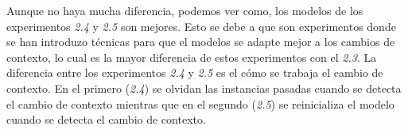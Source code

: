 \documentclass[11pt]{article}
\begin{document}
Aunque no haya mucha diferencia, podemos ver como, los modelos de los experimentos \textit{2.4} y \textit{2.5} son mejores. Esto se debe a que son experimentos donde se han introduzo técnicas para que el modelos se adapte mejor a los cambios de contexto, lo cual es la mayor diferencia de estos experimentos con el \textit{2.3}. La diferencia entre los experimentos \textit{2.4} y \textit{2.5} es el cómo se trabaja el cambio de contexto. En el primero (\textit{2.4}) se olvidan las instancias pasadas cuando se detecta el cambio de contexto mientras que en el segundo (\textit{2.5}) se reinicializa el modelo cuando se detecta el cambio de contexto.
\end{document}
